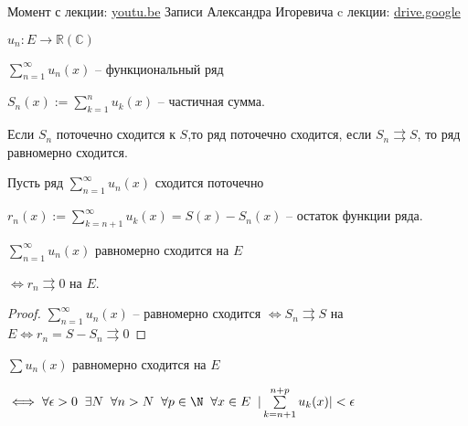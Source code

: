 
\begin{remark}
    Момент с лекции: \href{https://www.youtube.com/watch?v=KfeUfFaKZHo}{youtu.be} \newline
    Записи Александра Игоревича c лекции: \href{https://drive.google.com/file/d/1RjjQ-4fzkRGXTJR-QFnaVCY-DEZRW8Do/view}{drive.google}
\end{remark}

\begin{definition}\slashns
	
	$u_n : E \to \mathbb{R}(\mathbb{C})$
	
	$\sum\limits_{n = 1}^{\infty} u_n(x)$ -- функциональный ряд
	
	$S_n(x) := \sum\limits_{k = 1}^{n} u_k(x)$ -- частичная сумма.
	
	Если $S_n$ поточечно сходится к $S$,то ряд поточечно сходится, если $S_n \rightrightarrows S$, то ряд равномерно сходится.
\end{definition}

\begin{definition}\slashns
	
	Пусть ряд $\sum\limits_{n = 1}^{\infty} u_n(x)$ сходится поточечно
	
	$r_n(x) := \sum\limits_{k = n + 1}^{\infty} u_k(x) = S(x) - S_n(x)$ -- остаток функции ряда.
\end{definition}

\begin{theorem}\slashns
	
	$\sum\limits_{n = 1}^{\infty} u_n(x)$ равномерно сходится на $E$
	
	$\iff r_n \rightrightarrows 0$ на $E$.
\end{theorem}

\begin{proof}\slashns
	
	$\sum\limits_{n = 1}^{\infty} u_n(x)$ -- равномерно сходится $\iff S_n \rightrightarrows S$ на $E \iff r_n=S-S_n \rightrightarrows 0$
\end{proof}

\begin{theorem}\slashns
	
	$\sum u_n(x)$ равномерно сходится на $E$
	
	$\iff \forall \epsilon > 0 \;\; \exists N \;\; \forall n > N \;\; \forall p \in \N \;\; \forall x \in E \;\; |\sum\limits_{k = n+1}^{n+p} u_k(x)| < \epsilon$
\end{theorem}

